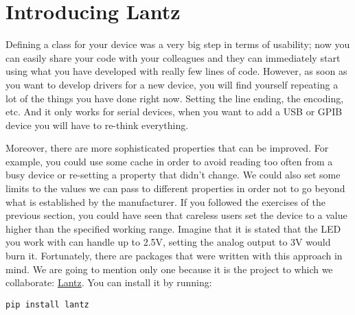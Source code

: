 
\section{Introducing Lantz}\label{introducinglantz}

Defining a class for your device was a very big step in terms of
usability; now you can easily share your code with your colleagues and
they can immediately start using what you have developed with really few
lines of code. However, as soon as you want to develop drivers for a new
device, you will find yourself repeating a lot of the things you have
done right now. Setting the line ending, the encoding, etc. And it only
works for serial devices, when you want to add a {USB} or {GPIB} device
you will have to re-think everything.

Moreover, there are more sophisticated properties that can be improved.
For example, you could use some cache in order to avoid reading too
often from a busy device or re-setting a property that didn't change. We
could also set some limits to the values we can pass to different
properties in order not to go beyond what is established by the
manufacturer. If you followed the exercises of the previous section, you
could have seen that careless users set the device to a value higher
than the specified working range. Imagine that it is stated that the
{LED} you work with can handle up to 2.5V, setting the analog output to
3V would burn it. Fortunately, there are packages that were written with
this approach in mind. We are going to mention only one because it is
the project to which we collaborate:
\href{https://lantz.readthedocs.io/en/0.3/}{Lantz}. You can install it
by running:

\begin{verbatim}
pip install lantz
\end{verbatim}


